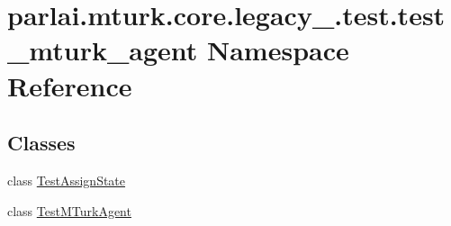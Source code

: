 \hypertarget{namespaceparlai_1_1mturk_1_1core_1_1legacy__2018_1_1test_1_1test__mturk__agent}{}\section{parlai.\+mturk.\+core.\+legacy\+\_.\+test.\+test\+\_\+mturk\+\_\+agent Namespace Reference}
\label{namespaceparlai_1_1mturk_1_1core_1_1legacy__2018_1_1test_1_1test__mturk__agent}
\subsection*{Classes}
\begin{DoxyCompactItemize}
\item 
class \hyperlink{classparlai_1_1mturk_1_1core_1_1legacy__2018_1_1test_1_1test__mturk__agent_1_1TestAssignState}{Test\+Assign\+State}
\item 
class \hyperlink{classparlai_1_1mturk_1_1core_1_1legacy__2018_1_1test_1_1test__mturk__agent_1_1TestMTurkAgent}{Test\+M\+Turk\+Agent}
\end{DoxyCompactItemize}
